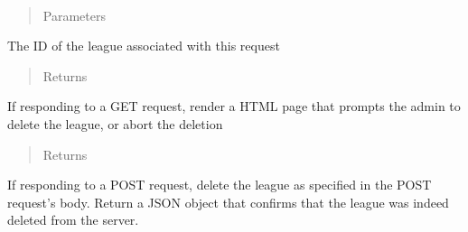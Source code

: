 \documentclass[letterpaper,10pt,english]{sphinxmanual}
\begin{document}
\begin{fulllineitems}
\label{\detokenize{tiger_leagues/readme:tiger_leagues.admin.delete_league}}~\begin{quote}\begin{description}
\item[{Parameters}] \leavevmode
{} \textendash{} 

\end{description}\end{quote}

The ID of the league associated with this request
\begin{quote}\begin{description}
\item[{Returns}] \leavevmode
{}

\end{description}\end{quote}

If responding to a GET request, render a HTML page that prompts the admin 
to delete the league, or abort the deletion
\begin{quote}\begin{description}
\item[{Returns}] \leavevmode
{}

\end{description}\end{quote}

If responding to a POST request, delete the league as specified in the POST 
request’s body. Return a JSON object that confirms that the league was 
indeed deleted from the server.

\end{fulllineitems}

\end{document}
